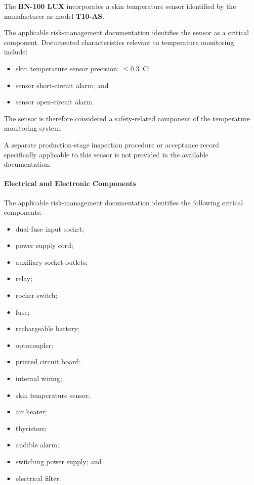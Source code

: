 The \textbf{BN-100 LUX} incorporates a skin temperature sensor
identified by the manufacturer as model \textbf{T10-AS}.

The applicable risk-management documentation identifies the sensor
as a critical component. Documented characteristics relevant to
temperature monitoring include:

\begin{itemize}
    \item skin temperature sensor precision:
    \(\leq 0.3\,^\circ\mathrm{C}\);
    \item sensor short-circuit alarm; and
    \item sensor open-circuit alarm.
\end{itemize}

The sensor is therefore considered a safety-related component of
the temperature monitoring system.

A separate production-stage inspection procedure or acceptance
record specifically applicable to this sensor is not provided in
the available documentation.


\paragraph{Electrical and Electronic Components}

The applicable risk-management documentation identifies the
following critical components:

\begin{itemize}
    \item dual-fuse input socket;
    \item power supply cord;
    \item auxiliary socket outlets;
    \item relay;
    \item rocker switch;
    \item fuse;
    \item rechargeable battery;
    \item optocoupler;
    \item printed circuit board;
    \item internal wiring;
    \item skin temperature sensor;
    \item air heater;
    \item thyristors;
    \item audible alarm;
    \item switching power supply; and
    \item electrical filter.
\end{itemize}

